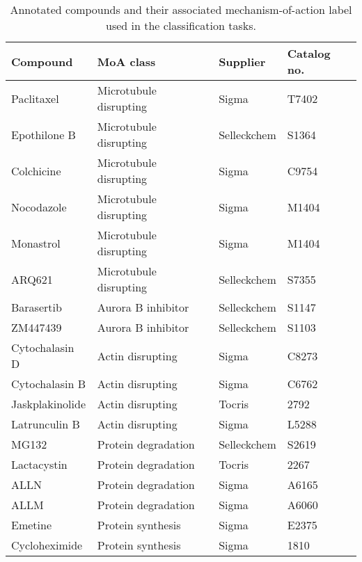 \documentclass[a4paper,11pt,twoside,openright]{scrbook}
\begin{document}
\begin{table}[]
    \begin{footnotesize}
    \centering
    \captionsetup{width=0.8\textwidth}
    \caption[Annotated compounds of known MoA]{Annotated compounds and their associated mechanism-of-action label used in the classification tasks.}
    \label{table:compounds}
    \begin{tabular}{@{}llll@{}}
    \toprule
    Compound        & MoA class              & Supplier    & Catalog no. \\ \midrule
    Paclitaxel      & Microtubule disrupting & Sigma       & T7402       \\
    Epothilone B    & Microtubule disrupting & Selleckchem & S1364       \\
    Colchicine      & Microtubule disrupting & Sigma       & C9754       \\
    Nocodazole      & Microtubule disrupting & Sigma       & M1404       \\
    Monastrol       & Microtubule disrupting & Sigma       & M1404       \\
    ARQ621          & Microtubule disrupting & Selleckchem & S7355       \\
    Barasertib      & Aurora B inhibitor     & Selleckchem & S1147       \\
    ZM447439        & Aurora B inhibitor     & Selleckchem & S1103       \\
    Cytochalasin D  & Actin disrupting       & Sigma       & C8273       \\
    Cytochalasin B  & Actin disrupting       & Sigma       & C6762       \\
    Jaskplakinolide & Actin disrupting       & Tocris      & 2792        \\
    Latrunculin B   & Actin disrupting       & Sigma       & L5288       \\
    MG132           & Protein degradation    & Selleckchem & S2619       \\
    Lactacystin     & Protein degradation    & Tocris      & 2267        \\
    ALLN            & Protein degradation    & Sigma       & A6165       \\
    ALLM            & Protein degradation    & Sigma       & A6060       \\
    Emetine         & Protein synthesis      & Sigma       & E2375       \\
    Cycloheximide   & Protein synthesis      & Sigma       & 1810        \\

\end{tabular}
\end{footnotesize}
\end{table}
\end{document}
